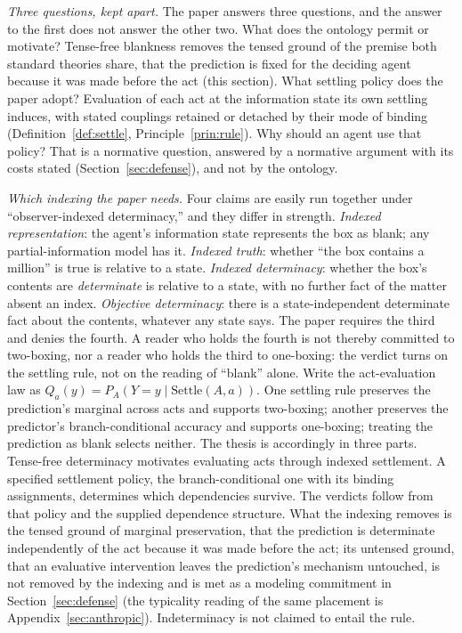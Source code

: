 \noindent \textit{Three questions, kept apart.} The paper answers three questions, and the answer to the first does not answer the other two. What does the ontology permit or motivate? Tense-free blankness removes the tensed ground of the premise both standard theories share, that the prediction is fixed for the deciding agent because it was made before the act (this section). What settling policy does the paper adopt? Evaluation of each act at the information state its own settling induces, with stated couplings retained or detached by their mode of binding (Definition~\ref{def:settle}, Principle~\ref{prin:rule}). Why should an agent use that policy? That is a normative question, answered by a normative argument with its costs stated (Section~\ref{sec:defense}), and not by the ontology.

\noindent \textit{Which indexing the paper needs.} Four claims are easily run together under ``observer-indexed determinacy,'' and they differ in strength. \emph{Indexed representation}: the agent's information state represents the box as blank; any partial-information model has it. \emph{Indexed truth}: whether ``the box contains a million'' is true is relative to a state. \emph{Indexed determinacy}: whether the box's contents are \emph{determinate} is relative to a state, with no further fact of the matter absent an index. \emph{Objective determinacy}: there is a state-independent determinate fact about the contents, whatever any state says. The paper requires the third and denies the fourth. A reader who holds the fourth is not thereby committed to two-boxing, nor a reader who holds the third to one-boxing: the verdict turns on the settling rule, not on the reading of ``blank'' alone. Write the act-evaluation law as $Q_a(y) = P_A(Y = y \mid \mathrm{Settle}(A, a))$. One settling rule preserves the prediction's marginal across acts and supports two-boxing; another preserves the predictor's branch-conditional accuracy and supports one-boxing; treating the prediction as blank selects neither. The thesis is accordingly in three parts. Tense-free determinacy motivates evaluating acts through indexed settlement. A specified settlement policy, the branch-conditional one with its binding assignments, determines which dependencies survive. The verdicts follow from that policy and the supplied dependence structure. What the indexing removes is the tensed ground of marginal preservation, that the prediction is determinate independently of the act because it was made before the act; its untensed ground, that an evaluative intervention leaves the prediction's mechanism untouched, is not removed by the indexing and is met as a modeling commitment in Section~\ref{sec:defense} (the typicality reading of the same placement is Appendix~\ref{sec:anthropic}). Indeterminacy is not claimed to entail the rule.

